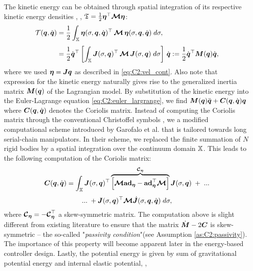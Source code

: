The kinetic energy can be obtained through spatial integration of its respective kinetic energy densities \cite{Boyer2010,Mochiyama2003,Tatlicioglu2007}, \ie,
$\mathfrak{T} = \frac{1}{2}{\boldsymbol{\eta}}^\top \boldsymbol{\mathcal{M}} {\boldsymbol{\eta}}
$:
%
\begin{align}
\mathcal{T}({{\boldsymbol{q}}},\dot{{{\boldsymbol{q}}}}) & = \frac{1}{2}\int_{\mathbb{X}} {\boldsymbol{\eta}}(\sigma,{{\boldsymbol{q}}},\dot{{\boldsymbol{q}}})^\top\,\boldsymbol{\mathcal{M}}\,{{\boldsymbol{\eta}}}(\sigma,{{\boldsymbol{q}}},\dot{{{\boldsymbol{q}}}}) \; d \sigma,
 \notag \\[0.35em]
& =  \frac{1}{2} \dot{{\boldsymbol{q}}}^\top \left[\int_{\mathbb{X}}  {\boldsymbol{J}}(\sigma,{\boldsymbol{q}})^\top\,\boldsymbol{\mathcal{M}}\, {\boldsymbol{J}}(\sigma,{\boldsymbol{q}}) \; d \sigma \right]\, \dot{{\boldsymbol{q}}} := \frac{1}{2}\dot{{\boldsymbol{q}}}^\top \boldsymbol{M}({\boldsymbol{q}}) \dot{{\boldsymbol{q}}},
\label{eq:C2:kinetic_energy}
\end{align}
%
%
where we used ${\boldsymbol{\eta}} = {\boldsymbol{J}} {\boldsymbol{q}}$ as described in \eqref{eq:C2:vel_cont}. Also note that expression for the kinetic energy naturally gives rise to the generalized inertia matrix ${\boldsymbol{M}}({\boldsymbol{q}})$ of the Lagrangian model. By substitution of the kinetic energy into the Euler-Lagrange equation \eqref{eq:C2:euler_largrange}, we find ${\boldsymbol{M}}({\boldsymbol{q}}){\ddot{\boldsymbol{q}}} + {\boldsymbol{C}}({\boldsymbol{q}},{\dot{\boldsymbol{q}}}){\boldsymbol{q}}$ where ${\boldsymbol{C}}({\boldsymbol{q}},\dot{{\boldsymbol{q}}})$ denotes the Coriolis matrix.  Instead of computing the Coriolis matrix through the conventional Christoffel symbols \cite{Murray1994}, we a modified computational scheme introduced by Garofalo et al. \cite{Garofalo2013} that is tailored towards long serial-chain manipulators. In their scheme, we replaced the finite summation of $N$ rigid bodies by a spatial integration over the continuum domain $\mathbb{X}$. This leads to the following computation of the Coriolis matrix: 
%
\begin{multline}
\boldsymbol{C}({\boldsymbol{q}},{\dot{\boldsymbol{q}}}) = \int_{\mathbb{X}} {\boldsymbol{J}}(\sigma,{\boldsymbol{q}})^\top \overbrace{\left[\boldsymbol{\mathcal{M}} \textbf{ad}_{{\boldsymbol{\eta}}}  - \textbf{ad}_{{\boldsymbol{\eta}}} ^\top \boldsymbol{\mathcal{M}} \right]}^{\boldsymbol{\mathcal{C}}_{{\boldsymbol{\eta}}}} {\boldsymbol{J}}(\sigma,{\boldsymbol{q}})\; +\; ... \\[0.35em] ...\; + {\boldsymbol{J}}(\sigma,{\boldsymbol{q}})^\top \boldsymbol{\mathcal{M}} \,\,\dot{\!\!{\boldsymbol{J}}}(\sigma,{\boldsymbol{q}},{\dot{\boldsymbol{q}}}) \; d \sigma,
\label{eq:C2:coriolis}
\end{multline}
%
where $\boldsymbol{\mathcal{C}}_{{\boldsymbol{\eta}}} = -\boldsymbol{\mathcal{C}}_{{\boldsymbol{\eta}}}^\top$ a skew-symmetric matrix. The computation above is slight different from existing literature \cite{Boyer2021,Renda2020} to ensure that the matrix $\dot{\boldsymbol{M}} - 2\boldsymbol{C}$ is skew-symmetric -- the so-called "\emph{passivity condition}"(see Assumption \ref{as:C2:passivity}). The importance of this property will become apparent later in the energy-based controller design. Lastly, the potential energy is given by sum of gravitational potential energy and internal elastic potential, \ie,
